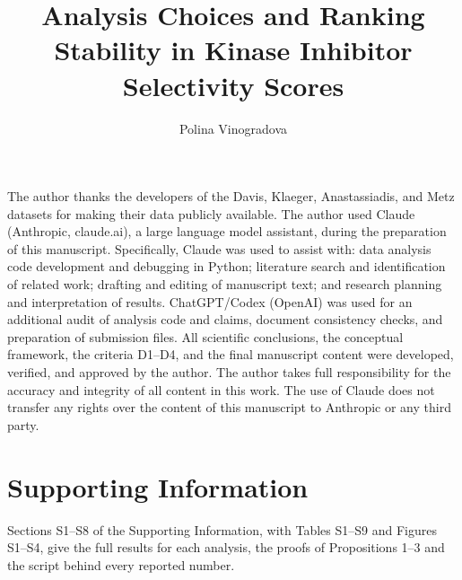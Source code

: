 \documentclass[journal=jcisd8,manuscript=article]{achemso}
\author{Polina Vinogradova}
\affiliation{Independent Researcher}
\title{Analysis Choices and Ranking Stability in Kinase Inhibitor
  Selectivity Scores}
\begin{document}







\begin{acknowledgement}
The author thanks the developers of the Davis, Klaeger, Anastassiadis, and Metz
datasets for making their data publicly available.
The author used Claude (Anthropic, claude.ai), a large language model assistant,
during the preparation of this manuscript.
Specifically, Claude was used to assist with: data analysis code development and
debugging in Python; literature search and identification of related work;
drafting and editing of manuscript text; and research planning and
interpretation of results.
ChatGPT/Codex (OpenAI) was used for an additional audit of analysis code and
claims, document consistency checks, and preparation of submission files.
All scientific conclusions, the conceptual framework, the criteria
D1--D4, and the final manuscript content were developed, verified, and
approved by the author.
The author takes full responsibility for the accuracy and integrity of all
content in this work.
The use of Claude does not transfer any rights over the content of this manuscript
to Anthropic or any third party.
\end{acknowledgement}

\section*{Supporting Information}
Sections S1--S8 of the Supporting Information, with Tables S1--S9 and Figures
S1--S4, give the full results for each analysis, the proofs of Propositions 1--3
and the script behind every reported number.
\end{document}
